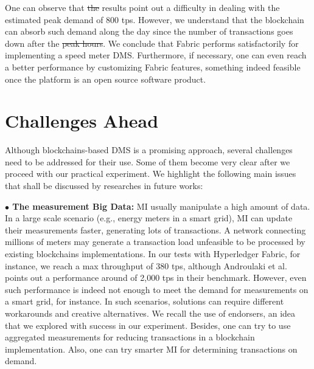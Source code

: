 \documentclass[journal]{IEEEtran}
\providecommand{\DIFadd}[1]{{\protect\color{blue}\uwave{#1}}} %
\providecommand{\DIFdel}[1]{{\protect\color{red}\sout{#1}}}                      %
\providecommand{\DIFaddbegin}{} %
\providecommand{\DIFaddend}{} %
\providecommand{\DIFdelbegin}{} %
\providecommand{\DIFdelend}{} %
\begin{document}
One can observe that \DIFdelbegin \DIFdel{the }\DIFdelend \DIFaddbegin \DIFadd{our }\DIFaddend results point out a difficulty in dealing with the estimated peak demand of 800 tps.
However, we understand that the blockchain can absorb such demand along the day since the number of transactions goes down after the \DIFdelbegin \DIFdel{peak hours}\DIFdelend \DIFaddbegin \DIFadd{rush hour}\DIFaddend .
We conclude that Fabric performs satisfactorily for implementing a speed meter DMS.
Furthermore, if necessary, one can even reach a better performance by customizing Fabric features, something indeed feasible once the platform is an open source software product.

\section{Challenges Ahead}
Although blockchains-based DMS is a promising approach, several challenges need to be addressed for their use.
Some of them become very clear after we proceed with our practical experiment.
We highlight the following main issues that shall be discussed by researches in future works:

\textbf{$\bullet$ The measurement Big Data:} MI usually manipulate a high amount of data. In a large scale scenario (e.g., energy meters in a smart grid), MI can update their measurements faster, generating lots of transactions. 
A network connecting millions of meters may generate a transaction load unfeasible to be processed by existing blockchains implementations. 
In our tests with Hyperledger Fabric, for instance, we reach a max throughput of 380 tps, although Androulaki et al. \cite{Androulaki2018} points out a performance around of 2,000 tps in their benchmark. 
However, even such performance is indeed not enough to meet the demand for measurements on a smart grid, for instance.
In such scenarios, solutions can require different workarounds and creative alternatives.
We recall the use of endorsers, an idea that we explored with success in our experiment.
Besides, one can try to use aggregated measurements for reducing transactions in a blockchain implementation. 
Also, one can try smarter MI for determining transactions on demand.

\end{document}
